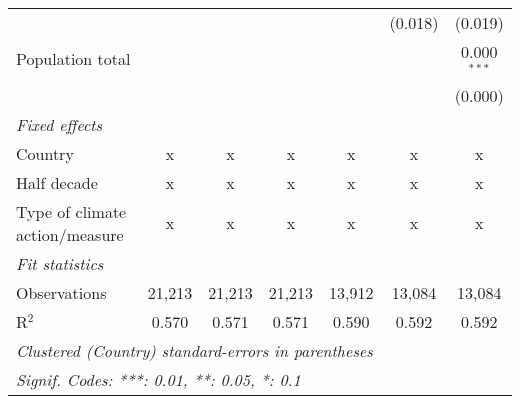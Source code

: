 \begin{tabular}{lcccccc}
                                                                                         &               &                &                &                & (0.018)        & (0.019)\\   
   Population total                                                                      &               &                &                &                &                & 0.000$^{***}$\\   
                                                                                         &               &                &                &                &                & (0.000)\\   
   \emph{Fixed effects}\\
   Country                                                                               & x             & x              & x              & x              & x              & x\\  
   Half decade                                                                           & x             & x              & x              & x              & x              & x\\  
   Type of climate action/measure                                                        & x             & x              & x              & x              & x              & x\\  
   \midrule \emph{Fit statistics}\\
   Observations                                                                          & 21,213        & 21,213         & 21,213         & 13,912         & 13,084         & 13,084\\  
   R$^2$                                                                                 & 0.570         & 0.571          & 0.571          & 0.590          & 0.592          & 0.592\\  
   \midrule
   \multicolumn{7}{l}{\emph{Clustered (Country) standard-errors in parentheses}}\\
   \multicolumn{7}{l}{\emph{Signif. Codes: ***: 0.01, **: 0.05, *: 0.1}}\\
\end{tabular}
\par\endgroup



